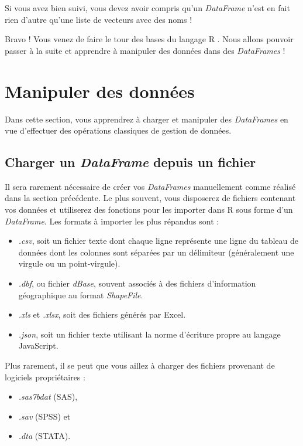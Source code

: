 \documentclass[
  11pt,
  french,
]{book}
\providecommand{\tightlist}{%
  \setlength{\itemsep}{0pt}\setlength{\parskip}{0pt}}
\begin{document}
Si vous avez bien suivi, vous devez avoir compris qu'un \emph{DataFrame} n'est en fait rien d'autre qu'une liste de vecteurs avec des noms !

Bravo ! Vous venez de faire le tour des bases du langage R . Nous allons pouvoir passer à la suite et apprendre à manipuler des données dans des \emph{DataFrames} !

\hypertarget{sect014}{%
\section{Manipuler des données}\label{sect014}}

Dans cette section, vous apprendrez à charger et manipuler des \emph{DataFrames} en vue d'effectuer des opérations classiques de gestion de données.

\hypertarget{sect0141}{%
\subsection{\texorpdfstring{Charger un \emph{DataFrame} depuis un fichier}{Charger un DataFrame depuis un fichier}}\label{sect0141}}

Il sera rarement nécessaire de créer vos \emph{DataFrames} manuellement comme réalisé dans la section précédente. Le plus souvent, vous disposerez de fichiers contenant vos données et utiliserez des fonctions pour les importer dans R sous forme d'un \emph{DataFrame}. Les formats à importer les plus répandus sont :

\begin{itemize}
\tightlist
\item
  \emph{.csv}, soit un fichier texte dont chaque ligne représente une ligne du tableau de données dont les colonnes sont séparées par un délimiteur (généralement une virgule ou un point-virgule).
\item
  \emph{.dbf}, ou fichier \emph{dBase}, souvent associés à des fichiers d'information géographique au format \emph{ShapeFile}.
\item
  \emph{.xls} et \emph{.xlsx}, soit des fichiers générés par Excel.
\item
  \emph{.json}, soit un fichier texte utilisant la norme d'écriture propre au langage JavaScript.
\end{itemize}

Plus rarement, il se peut que vous aillez à charger des fichiers provenant de logiciels propriétaires :

\begin{itemize}
\tightlist
\item
  \emph{.sas7bdat} (SAS),
\item
  \emph{.sav} (SPSS) et
\item
  \emph{.dta} (STATA).
\end{itemize}
\end{document}
